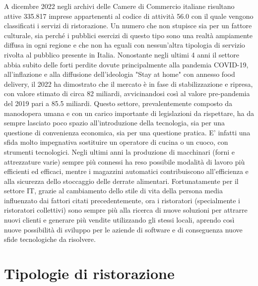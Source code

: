 \documentclass[a4paper, titlepage, 12pt, openright, twoside]{book}
\begin{document}
A dicembre 2022 negli archivi delle Camere di Commercio italiane risultano attive 335.817 
imprese appartenenti al codice di attività 56.0 con il quale vengono classificati i servizi di ristorazione.
Un numero che non stupisce sia per un fattore culturale, sia perché i pubblici esercizi di questo tipo sono
una realtà ampiamente diffusa in ogni regione e che non ha eguali con nessun'altra tipologia di servizio rivolta al pubblico presente in Italia.
\newline
Nonostante negli ultimi 4 anni il settore abbia subito delle forti perdite dovute principalmente alla pandemia COVID-19,
all'inflazione e alla diffusione dell'ideologia "Stay at home" con annesso food delivery, 
il 2022 ha dimostrato che il mercato è in fase di stabilizzazione e ripresa, con valore stimato di circa 82 miliardi,
avvicinandosi così al valore pre-pandemia del 2019 pari a 85.5 miliardi. \cite{rristorazione}
\newline
Questo settore, prevalentemente composto da manodopera umana e con un carico importante di legislazioni da rispettare, ha da sempre lasciato poco spazio all’introduzione della tecnologia, sia per una questione di convenienza economica, sia per una questione pratica. E’ infatti una sfida molto impegnativa sostituire un operatore di cucina o un cuoco, con strumenti tecnologici. Negli ultimi anni la produzione di macchinari (forni e attrezzature varie) sempre più connessi ha reso possibile modalità di lavoro più efficienti ed efficaci, mentre i magazzini automatici contribuiscono all'efficienza e alla sicurezza dello stoccaggio delle derrate alimentari.
\newline
Fortunatamente per il settore IT, grazie al cambiamento dello stile di vita della persona media influenzato dai fattori citati precedentemente,
ora i ristoratori (specialmente i ristoratori collettivi) sono sempre più alla ricerca di nuove soluzioni per attrarre nuovi clienti
e generare più vendite utilizzando gli stessi locali, aprendo così nuove possibilità di sviluppo per le aziende di software e di conseguenza nuove sfide tecnologiche da risolvere.

\section{Tipologie di ristorazione}
\end{document}
